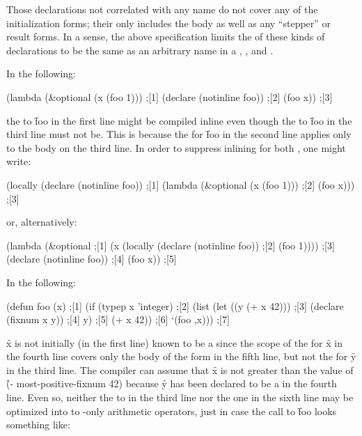 Those declarations not correlated with any name  do
not cover any of the initialization forms; their  only
includes the body as well as any ``stepper'' or result forms.  In a
sense, the above specification limits the  of these
kinds of declarations to be the same as an arbitrary name 
 in a , , 
and 
.

In the following:

\code
 (lambda (&optional (x (foo 1))) ;[1]
   (declare (notinline foo))     ;[2]
   (foo x))                      ;[3]
\endcode

the  to \f{foo} in the first line might be 
compiled inline even though the  to \f{foo} in
the third line must not be.  This is because
the  
for \f{foo} in the second line applies only to the body on the
third line.  In order to suppress inlining for both , 
one might write:

\code
 (locally (declare (notinline foo)) ;[1]
   (lambda (&optional (x (foo 1)))  ;[2]
     (foo x)))                      ;[3]
\endcode

or, alternatively:

\code
 (lambda (&optional                               ;[1]
            (x (locally (declare (notinline foo)) ;[2]
                 (foo 1))))                       ;[3]
   (declare (notinline foo))                      ;[4]
   (foo x))                                       ;[5]
\endcode

In the following:

\code
 (defun foo (x)                               ;[1]
   (if (typep x 'integer)                     ;[2]
       (list (let ((y (+ x 42)))              ;[3]
               (declare (fixnum x y))         ;[4]
               y)                             ;[5]
             (+ x 42))                        ;[6]
       `(foo ,x)))                            ;[7]
\endcode

\f{x} is not initially (\eg in the first line) known to be a  
since the scope of the   for \f{x} in the fourth line
covers only the body of the  form in the fifth line, but not the
 for \f{y} in the third line.  The compiler can assume that
\f{x} is not greater than the value of \f{(- most-positive-fixnum 42)} because \f{y}
has been declared to be a  in the fourth line.
Even so, neither the  to \funref{+} in the third line 
             nor the one in the sixth line 
may be optimized into  to  
-only arithmetic operators,
just in case the call to \f{foo} looks something like:

